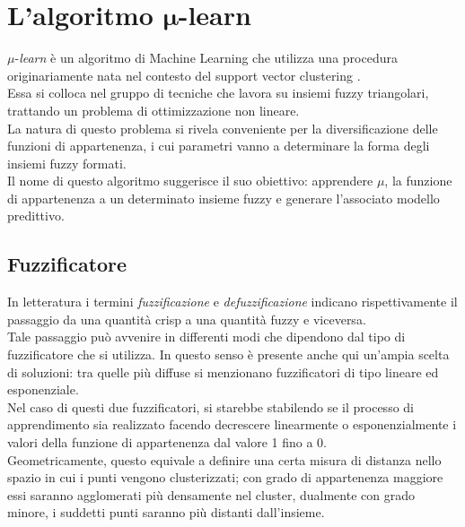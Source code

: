 \documentclass[12pt]{report}
\theoremstyle{definition}
\begin{document}
\section[\texorpdfstring{L'algoritmo $\mu$-learn}%
                        {mu-learn}]%
        {L'algoritmo $\bm{\mu}$-learn}  %
\label{mulearn}
$\mu$-\textit{learn} è un algoritmo di Machine Learning che utilizza una procedura originariamente nata nel contesto del support vector clustering \cite{23}.
\\
Essa si colloca nel gruppo di tecniche che lavora su insiemi fuzzy triangolari, trattando un problema di ottimizzazione non lineare.
\\
La natura di questo problema si rivela conveniente per la diversificazione delle funzioni di appartenenza, i cui parametri vanno a determinare la forma degli insiemi fuzzy formati.
\\
Il nome di questo algoritmo suggerisce il suo obiettivo: apprendere $\mu$, la funzione di appartenenza a un determinato insieme fuzzy e generare l'associato modello predittivo.

\subsection{Fuzzificatore} \label{fuzzificatore}
In letteratura i termini \textit{fuzzificazione} e \textit{defuzzificazione} indicano rispettivamente il passaggio da una quantità crisp a una quantità fuzzy e viceversa.
\\
Tale passaggio può avvenire in differenti modi che dipendono dal tipo di fuzzificatore che si utilizza. In questo senso è presente anche qui un'ampia scelta di soluzioni: tra quelle più diffuse si menzionano fuzzificatori di tipo lineare ed esponenziale.
\\
Nel caso di questi due fuzzificatori, si starebbe stabilendo se il processo di apprendimento sia realizzato facendo decrescere linearmente o esponenzialmente i valori della funzione di appartenenza dal valore 1 fino a 0.
\\
Geometricamente, questo equivale a definire una certa misura di distanza nello spazio in cui i punti vengono clusterizzati; con grado di appartenenza maggiore essi saranno agglomerati più densamente nel cluster, dualmente con grado minore, i suddetti punti saranno più distanti dall'insieme.
\end{document}
